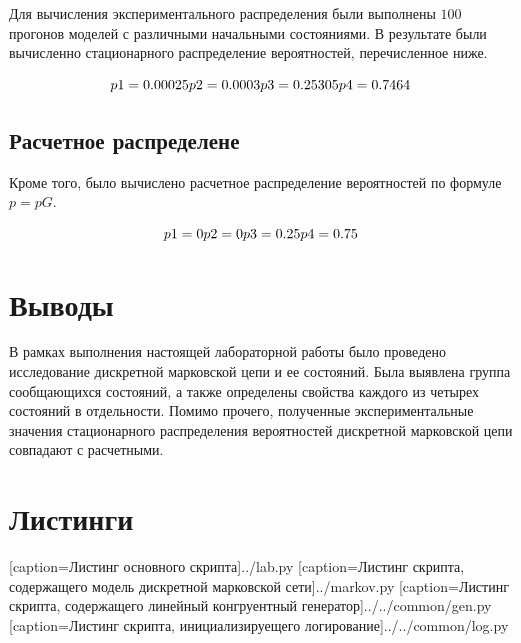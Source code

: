 Для вычисления экспериментального распределения были выполнены $100$ прогонов моделей с различными начальными состояниями.
В результате были вычисленно стационарного распределение вероятностей, перечисленное ниже.

\[
  p1 = 0.00025\\
  p2 = 0.0003\\
  p3 = 0.25305\\
  p4 = 0.7464
\]

\subsection{Расчетное распределене}

Кроме того, было вычислено расчетное распределение вероятностей по формуле $p=pG$.

\[
  p1 = 0\\
  p2 = 0\\
  p3 = 0.25\\
  p4 = 0.75
\]

\section{Выводы}

В рамках выполнения настоящей лабораторной работы было проведено исследование дискретной марковской цепи и ее состояний.
Была выявлена группа сообщающихся состояний, а также определены свойства каждого из четырех состояний в отдельности.
Помимо прочего, полученные экспериментальные значения стационарного распределения вероятностей дискретной марковской цепи совпадают с
расчетными.

\section{Листинги}

[caption=Листинг основного скрипта]{../lab.py}
[caption=Листинг скрипта, содержащего модель дискретной марковской сети]{../markov.py}
[caption=Листинг скрипта, содержащего линейный конгруентный генератор]{../../common/gen.py}
[caption=Листинг скрипта, инициализируещего логирование]{../../common/log.py}
